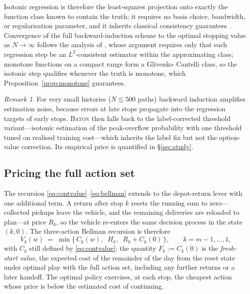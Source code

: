 \documentclass[preprint,authoryear,12pt]{elsarticle}
\theoremstyle{definition}
\theoremstyle{remark}
\newtheorem{remark}{Remark}
\begin{document}
Isotonic regression is therefore the least-squares projection onto
exactly the function class known to contain the truth; it requires no
basis choice, bandwidth, or regularisation parameter, and it inherits
classical consistency guarantees
\citep{robbins1955empirical,barlow1972statistical}. Convergence of the
full backward-induction scheme to the optimal stopping value as
$N \to \infty$ follows the analysis of \citet{clement2002analysis},
whose argument requires only that each regression step be an
$L^2$-consistent estimator within the approximating class; monotone
functions on a compact range form a Glivenko--Cantelli class, so the
isotonic step qualifies whenever the truth is monotone, which
Proposition~\ref{prop:monotone} guarantees.

\begin{remark}\label{rem:smalln}
For very small histories ($N \lesssim 500$ paths) backward induction
amplifies estimation noise, because errors at late stops propagate into
the regression targets of early stops. \textsc{Baton} then falls back
to the label-corrected threshold variant---isotonic estimation of the
peak-overflow probability with one threshold tuned on realised training
cost---which inherits the label fix but not the option-value
correction. Its empirical price is quantified in \S\ref{sec:study}.
\end{remark}

\subsection{Pricing the full action set}\label{sec:actions}

The recursion \eqref{eq:contvalue}--\eqref{eq:bellman} extends to the
depot-return lever with one additional term. A return after stop $k$
resets the running sum to zero---collected pickups leave the vehicle,
and the remaining deliveries are reloaded to plan---at price $R_k$, so
the vehicle re-enters the same decision process in the state
$(k, 0)$. The three-action Bellman recursion is therefore
\begin{equation}\label{eq:bellman3}
  V_k(w) \;=\; \min\bigl\{\, C_k(w),\;\; H_k,\;\;
      R_k + C_k(0) \,\bigr\},
  \qquad k = m-1, \dots, 1 ,
\end{equation}
with $C_k$ still defined by \eqref{eq:contvalue}; the quantity
$F_k := C_k(0)$ is the \emph{fresh-start value}, the expected cost of
the remainder of the day from the reset state under optimal play with
the full action set, including any further returns or a later handoff.
The optimal policy exercises, at each stop, the cheapest action whose
price is below the estimated cost of continuing.
\end{document}
